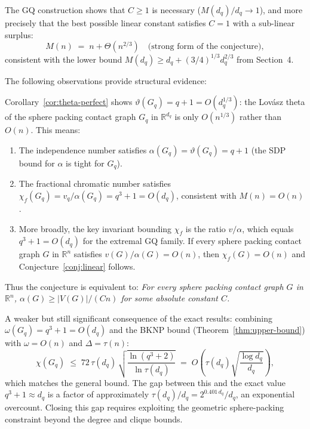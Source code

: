 The GQ construction shows that $C\ge 1$ is necessary ($M(d_q)/d_q\to 1$), and more precisely that the best possible linear constant satisfies $C=1$ with a sub-linear surplus:
\[
  M(n) \;=\; n + \Theta(n^{2/3}) \quad\text{(strong form of the conjecture)},
\]
consistent with the lower bound $M(d_q)\ge d_q+(3/4)^{1/3}d_q^{2/3}$ from Section~4.

The following observations provide structural evidence:

\begin{remark}\label{rem:theta-evidence}
Corollary~\ref{cor:theta-perfect} shows $\vartheta(G_q)=q+1=O(d_q^{1/3})$: the Lov\'asz theta of the sphere packing contact graph $G_q$ in $\mathbb{R}^{d_q}$ is only $O(n^{1/3})$ rather than $O(n)$.  This means:
\begin{enumerate}
  \item The independence number satisfies $\alpha(G_q)=\vartheta(G_q)=q+1$ (the SDP bound for $\alpha$ is tight for $G_q$).
  \item The fractional chromatic number satisfies $\chi_f(G_q)=v_q/\alpha(G_q)=q^3+1=O(d_q)$, consistent with $M(n)=O(n)$.
  \item More broadly, the key invariant bounding $\chi_f$ is the ratio $v/\alpha$, which equals $q^3+1=O(d_q)$ for the extremal GQ family.  If every sphere packing contact graph $G$ in $\mathbb{R}^n$ satisfies $v(G)/\alpha(G)=O(n)$, then $\chi_f(G)=O(n)$ and Conjecture~\ref{conj:linear} follows.
\end{enumerate}
Thus the conjecture is equivalent to: \emph{For every sphere packing contact graph $G$ in $\mathbb{R}^n$, $\alpha(G)\ge|V(G)|/(Cn)$ for some absolute constant $C$.}
\end{remark}

\begin{remark}\label{rem:poly-bound}
A weaker but still significant consequence of the exact results: combining $\omega(G_q)=q^3+1=O(d_q)$ and the BKNP bound (Theorem~\ref{thm:upper-bound}) with $\omega=O(n)$ and $\Delta=\tau(n)$:
\[
  \chi(G_q)\;\le\; 72\,\tau(d_q)\,\sqrt{\frac{\ln(q^3+2)}{\ln\tau(d_q)}} \;=\; O\!\left(\tau(d_q)\sqrt{\frac{\log d_q}{d_q}}\right),
\]
which matches the general bound.  The gap between this and the exact value $q^3+1\approx d_q$ is a factor of approximately $\tau(d_q)/d_q = 2^{0.401\,d_q}/d_q$, an exponential overcount.  Closing this gap requires exploiting the geometric sphere-packing constraint beyond the degree and clique bounds.
\end{remark}

